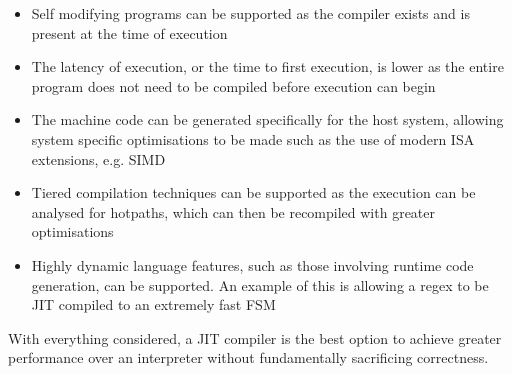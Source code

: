 \begin{itemize}
	\item Self modifying programs can be supported as the compiler exists and is present at the time of execution
	\item The latency of execution, or the time to first execution, is lower as the entire program does not need to be compiled before execution can begin
	\item The machine code can be generated specifically for the host system, allowing system specific optimisations to be made such as the use of modern ISA extensions, e.g. SIMD
	\item Tiered compilation techniques can be supported as the execution can be analysed for hotpaths, which can then be recompiled with greater optimisations
	\item Highly dynamic language features, such as those involving runtime code generation, can be supported. An example of this is allowing a regex to be JIT compiled to an extremely fast FSM
\end{itemize}

With everything considered, a JIT compiler is the best option to achieve greater performance over an interpreter without fundamentally sacrificing correctness.
